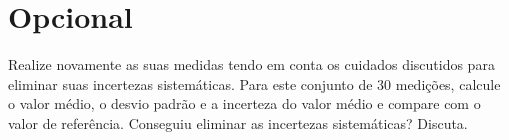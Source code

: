 \vspace{-0.7cm}
\section*{Opcional} 

Realize novamente as suas medidas tendo em conta os cuidados discutidos para eliminar suas incertezas sistemáticas. Para este conjunto de 30 medições, calcule o valor médio, o desvio padrão e a incerteza do valor médio e compare com o valor de referência. Conseguiu eliminar as incertezas sistemáticas?  Discuta. 
